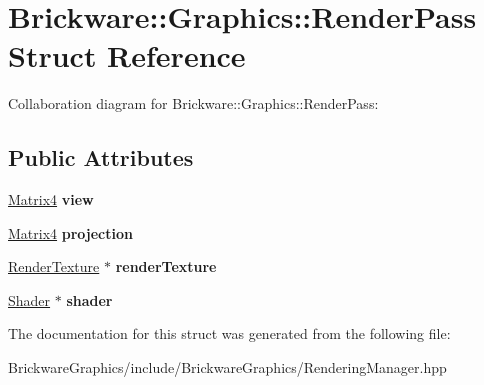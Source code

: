 \hypertarget{structBrickware_1_1Graphics_1_1RenderPass}{}\section{Brickware\+:\+:Graphics\+:\+:Render\+Pass Struct Reference}
\label{structBrickware_1_1Graphics_1_1RenderPass}


Collaboration diagram for Brickware\+:\+:Graphics\+:\+:Render\+Pass\+:
\subsection*{Public Attributes}
\begin{DoxyCompactItemize}
\item 
\hypertarget{structBrickware_1_1Graphics_1_1RenderPass_a6efeaf211626110b8e14acde114dbb32}{}\hyperlink{classBrickware_1_1Math_1_1Matrix4}{Matrix4} {\bfseries view}\label{structBrickware_1_1Graphics_1_1RenderPass_a6efeaf211626110b8e14acde114dbb32}

\item 
\hypertarget{structBrickware_1_1Graphics_1_1RenderPass_a3e4e6a03a0ef27a06e0847f915c4dd30}{}\hyperlink{classBrickware_1_1Math_1_1Matrix4}{Matrix4} {\bfseries projection}\label{structBrickware_1_1Graphics_1_1RenderPass_a3e4e6a03a0ef27a06e0847f915c4dd30}

\item 
\hypertarget{structBrickware_1_1Graphics_1_1RenderPass_a976487c734eb2a4e00f096ee7ba2354b}{}\hyperlink{classBrickware_1_1Graphics_1_1RenderTexture}{Render\+Texture} $\ast$ {\bfseries render\+Texture}\label{structBrickware_1_1Graphics_1_1RenderPass_a976487c734eb2a4e00f096ee7ba2354b}

\item 
\hypertarget{structBrickware_1_1Graphics_1_1RenderPass_a1db0b771711c16fc4a3edcdff3c97e3e}{}\hyperlink{classBrickware_1_1Graphics_1_1Shader}{Shader} $\ast$ {\bfseries shader}\label{structBrickware_1_1Graphics_1_1RenderPass_a1db0b771711c16fc4a3edcdff3c97e3e}

\end{DoxyCompactItemize}


The documentation for this struct was generated from the following file\+:\begin{DoxyCompactItemize}
\item 
Brickware\+Graphics/include/\+Brickware\+Graphics/Rendering\+Manager.\+hpp\end{DoxyCompactItemize}
